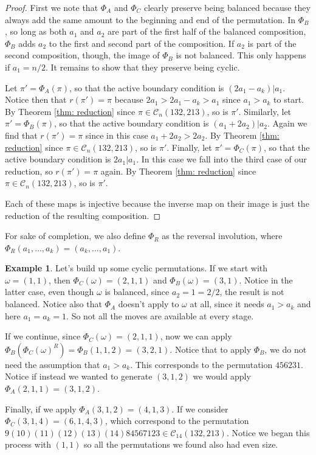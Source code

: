 \documentclass[11pt]{article}
\newcommand\C{\mathcal C}
\theoremstyle{definition}
\newtheorem{example}[theorem]{Example}
\begin{document}
\begin{proof}
    First we note that $\Phi_A$ and $\Phi_C$ clearly preserve being balanced because they always add the same amount to the beginning and end of the permutation. In $\Phi_B$, so long as both $a_1$ and $a_2$ are part of the first half of the balanced composition, $\Phi_B$ adds $a_2$ to the first and second part of the composition. If $a_2$ is part of the second composition, though, the image of $\Phi_B$ is not balanced. This only happens if $a_1 = n/2$. It remains to show that they preserve being cyclic.
    
    Let $\pi' = \Phi_A(\pi)$, so that the active boundary condition is $(2a_1-a_k)|a_1$. Notice then that $r(\pi') = \pi$ because $2a_1 > 2a_1-a_k > a_1$ since $a_1>a_k$ to start. By Theorem \ref{thm: reduction} since $\pi \in \C_n(132,213)$, so is $\pi'$. Similarly, let $\pi' = \Phi_B(\pi)$, so that the active boundary condition is $(a_1+2a_2)|a_2$. Again we find that $r(\pi') = \pi$ since in this case $a_1+2a_2 > 2a_2$. By Theorem \ref{thm: reduction} since $\pi \in \C_n(132,213)$, so is $\pi'$. Finally, let $\pi' = \Phi_C(\pi)$, so that the active boundary condition is $2a_1|a_1$. In this case we fall into the third case of our reduction, so $r(\pi') = \pi$ again. By Theorem \ref{thm: reduction} since $\pi \in \C_n(132,213)$, so is $\pi'$.

    Each of these maps is injective because the inverse map on their image is just the reduction of the resulting composition.
\end{proof}

For sake of completion, we also define $\Phi_R$ as the reversal involution, where $\Phi_R(a_1,\dots,a_k) = (a_k,\dots,a_1)$. 

\begin{example}
     Let's build up some cyclic permutations. If we start with $\omega = (1,1)$, then $\Phi_{C}(\omega) = (2,1,1)$ and $\Phi_B(\omega) = (3,1)$. Notice in the latter case, even though $\omega$ is balanced, since $a_2 = 1 = 2/2$, the result is not balanced. Notice also that $\Phi_A$ doesn't apply to $\omega$ at all, since it needs $a_1 > a_k$ and here $a_1 = a_k = 1$. So not all the moves are available at every stage.

    If we continue, since $\Phi_C(\omega) = (2,1,1)$, now we can apply $\Phi_B(\Phi_C(\omega)^R) = \Phi_B(1,1,2) = (3,2,1)$. Notice that to apply $\Phi_B$, we do not need the assumption that $a_1 > a_k$. This corresponds to the permutation $456231$. Notice if instead we wanted to generate $(3,1,2)$ we would apply $\Phi_A(2,1,1) = (3,1,2)$.

    Finally, if we apply $\Phi_A(3,1,2) = (4,1,3)$. If we consider $\Phi_C(3,1,4) = (6,1,4,3)$, which correspond to the permutation $9(10)(11)(12)(13)(14)84567123 \in \C_{14}(132,213)$. Notice we began this process with $(1,1)$ so all the permutations we found also had even size.
\end{example}
\end{document}
